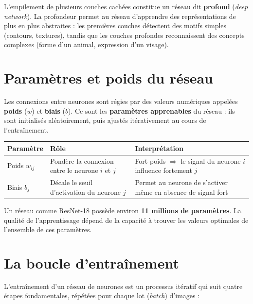\documentclass[11pt,a4paper,openany]{book}
\newcommand{\tableheadcolor}{\rowcolor{headerbg}}
\begin{document}
L'empilement de plusieurs couches cachées constitue un réseau dit \textbf{profond} (\textit{deep network}). La profondeur permet au réseau d'apprendre des représentations de plus en plus abstraites : les premières couches détectent des motifs simples (contours, textures), tandis que les couches profondes reconnaissent des concepts complexes (forme d'un animal, expression d'un visage).

\section{Paramètres et poids du réseau}

Les connexions entre neurones sont régies par des valeurs numériques appelées \textbf{poids} ($w$) et \textbf{biais} ($b$). Ce sont les \textbf{paramètres apprenables} du réseau : ils sont initialisés aléatoirement, puis ajustés itérativement au cours de l'entraînement.

\vspace{0.8em}
\renewcommand{\arraystretch}{1.4}
\begin{tabularx}{\linewidth}{C{2.8cm} L{4.5cm} L{8cm}}
  \toprule
  \tableheadcolor
  \textbf{Paramètre} & \textbf{Rôle} & \textbf{Interprétation} \\
  \midrule
  Poids $w_{ij}$ & Pondère la connexion entre le neurone $i$ et $j$ & Fort poids $\Rightarrow$ le signal du neurone $i$ influence fortement $j$ \\
  Biais $b_j$ & Décale le seuil d'activation du neurone $j$ & Permet au neurone de s'activer même en absence de signal fort \\
  \bottomrule
\end{tabularx}

\vspace{0.5em}
Un réseau comme ResNet-18 possède environ \textbf{11 millions de paramètres}. La qualité de l'apprentissage dépend de la capacité à trouver les valeurs optimales de l'ensemble de ces paramètres.

\section{La boucle d'entraînement}

L'entraînement d'un réseau de neurones est un processus itératif qui suit quatre étapes fondamentales, répétées pour chaque lot (\textit{batch}) d'images :
\end{document}
